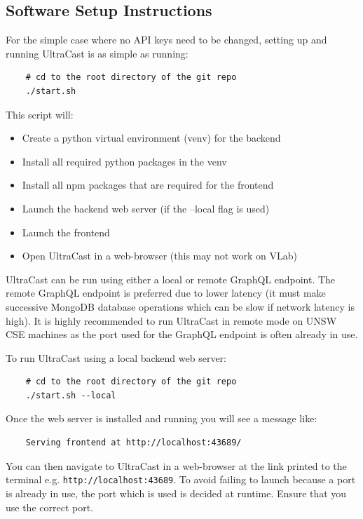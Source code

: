 \documentclass[../report.tex]{subfiles}
\begin{document}
   

\subsection{Software Setup Instructions} \label{ssec:setup_instructions}

For the simple case where no API keys need to be changed, setting up and running UltraCast is as simple as running:

\begin{verbatim}
    # cd to the root directory of the git repo
    ./start.sh
\end{verbatim}
%
This script will: 
\begin{itemize}
    \item Create a python virtual environment (venv) for the backend
    \item Install all required python packages in the venv
    \item Install all npm packages that are required for the frontend
    \item Launch the backend web server (if the --local flag is used)
    \item Launch the frontend
    \item Open UltraCast in a web-browser (this may not work on VLab)
\end{itemize}

UltraCast can be run using either a local or remote GraphQL endpoint.
The remote GraphQL endpoint is preferred due to lower latency (it must make successive MongoDB database operations which can be slow if network latency is high).
It is highly recommended to run UltraCast in remote mode on UNSW CSE machines as the port used for the GraphQL endpoint is often already in use.

To run UltraCast using a local backend web server:

\begin{verbatim}
    # cd to the root directory of the git repo
    ./start.sh --local
\end{verbatim}

Once the web server is installed and running you will see a message like:

\begin{verbatim}
    Serving frontend at http://localhost:43689/
\end{verbatim}

You can then navigate to UltraCast in a web-browser at the link printed to the terminal e.g. \verb|http://localhost:43689|.
To avoid failing to launch because a port is already in use, the port which is used is decided at runtime. Ensure that you use the correct port.
\end{document}
